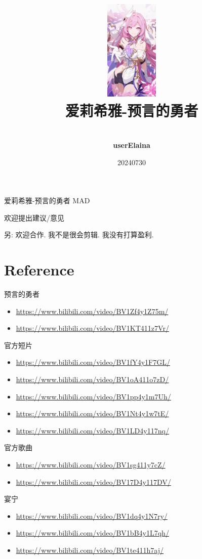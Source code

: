 \documentclass[a4paper]{article}
\title{
    \vspace*{1.0in}
    \includegraphics[width=1in]{figures/100154449_p0.jpg} \\
    \vspace*{1in}
    \textbf{\Huge 爱莉希雅-预言的勇者}
    \vspace{0.5in}
}
\author{ \\
    \textbf{\huge userElaina} \\
    \vspace*{1in}
}
\date{\LARGE 20240730}
\begin{document}
\LARGE

\maketitle
\tableofcontents
\thispagestyle{empty}
\newpage

爱莉希雅-预言的勇者 MAD

欢迎提出建议/意见

另: 欢迎合作. 我不是很会剪辑. 我没有打算盈利.

\section{Reference}

预言的勇者

\begin{itemize}
    \item \href{预言的勇者}{https://www.bilibili.com/video/BV1Zf4y1Z75m/}
    \item \href{预言的勇者解析}{https://www.bilibili.com/video/BV1KT411z7Vr/}
\end{itemize}

官方短片

\begin{itemize}
    \item \href{因你而在的故事}{https://www.bilibili.com/video/BV1fY4y1F7GL/}
    \item \href{黄金庭院: 冬日里的新年愿望}{https://www.bilibili.com/video/BV1oA411o7zD/}
    \item \href{天使归来}{https://www.bilibili.com/video/BV1pp4y1m7Uh/}
    \item \href{2022崩坏3同人大电影}{https://www.bilibili.com/video/BV1Nt4y1w7tE/}
    \item \href{嗨, 想我了吗♪}{https://www.bilibili.com/video/BV1LD4y117nq/}
\end{itemize}

官方歌曲

\begin{itemize}
    \item \href{TruE}{https://www.bilibili.com/video/BV1sg411y7cZ/}
    \item \href{重逢 [同人大电影ED]}{https://www.bilibili.com/video/BV17D4y117DV/}
\end{itemize}

宴宁

\begin{itemize}
    \item \href{Elysia}{https://www.bilibili.com/video/BV1dq4y1N7ry/}
    \item \href{致爱}{https://www.bilibili.com/video/BV1bB4y1L7qh/}
    \item \href{让我牵着你的手}{https://www.bilibili.com/video/BV1te411h7aj/}
\end{itemize}
\end{document}
